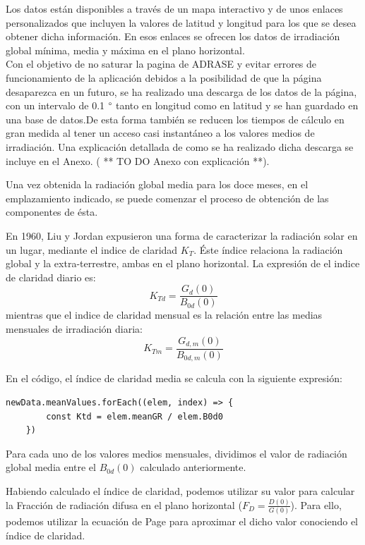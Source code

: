 Los datos están disponibles a través de un mapa interactivo y de unos enlaces personalizados que incluyen la valores de latitud y longitud para los que se desea obtener dicha información. En esos enlaces se ofrecen los datos de irradiación global mínima, media y máxima en el plano horizontal.\\

Con el objetivo de no saturar la pagina de ADRASE y evitar errores de funcionamiento de la aplicación debidos a la posibilidad de que la página desaparezca en un futuro, se ha realizado una descarga de los datos de la página, con un intervalo de 0.1 $\degree$ tanto en longitud como en latitud y se han guardado en una base de datos.De esta forma también se reducen los tiempos de cálculo en gran medida al tener un acceso casi instantáneo a los valores medios de irradiación. 
Una explicación detallada de como se ha realizado dicha descarga se incluye en el Anexo. ( ** TO DO Anexo con explicación **).

Una vez obtenida la radiación global media para los doce meses, en el emplazamiento indicado, se puede comenzar el proceso de obtención de las componentes de ésta.

En 1960, Liu y Jordan \cite{lj60} expusieron una forma de caracterizar la radiación solar en un lugar, mediante el indice de claridad $K_T$. Éste índice relaciona la radiación global y la extra-terrestre, ambas en el plano horizontal. La expresión de el indice de claridad diario es:\\

\begin{equation}
\label{eqn:ktd}
K_{Td} = \frac{G_d(0)}{B_{0d}(0)}
\end{equation}
mientras que el indice de claridad mensual es la relación entre las medias mensuales de irradiación diaria:
\begin{equation}
K_{Tm} = \frac{G_{d,m}(0)}{B_{0d,m}(0)}
\end{equation}

En el código, el índice de claridad media se calcula con la siguiente expresión:
\begin{lstlisting}[style=ES6, caption={Índice de claridad diario}]
	newData.meanValues.forEach((elem, index) => {
		const Ktd = elem.meanGR / elem.B0d0
	})
\end{lstlisting}
Para cada uno de los valores medios mensuales, dividimos el valor de radiación global media entre el $B_{0d}(0)$ calculado anteriormente.

Habiendo calculado el índice de claridad, podemos utilizar su valor para calcular la Fracción de radiación difusa en el plano horizontal ($F_D=\frac{D(0)}{G(0)}$). Para ello, podemos utilizar la ecuación de Page para aproximar el dicho valor conociendo el índice de claridad.

